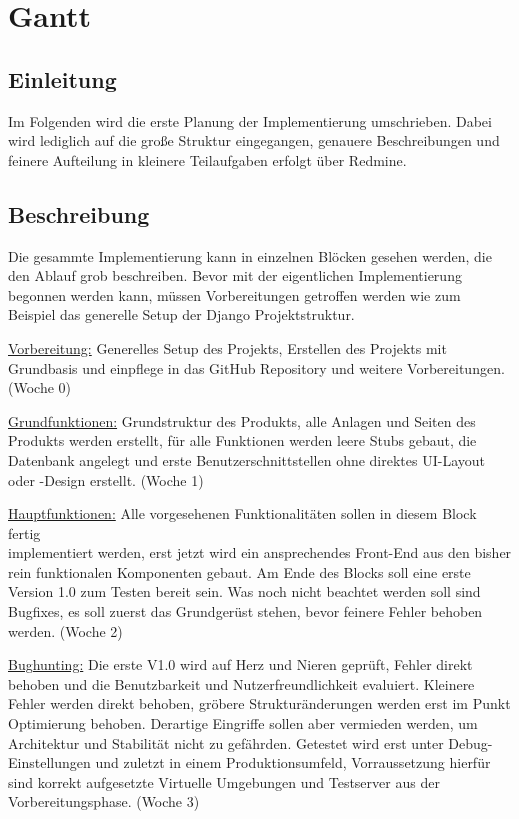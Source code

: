 \chapter{Gantt}

\section{Einleitung}
 Im Folgenden wird die erste Planung der Implementierung umschrieben. Dabei wird lediglich auf die große Struktur eingegangen, genauere Beschreibungen und feinere Aufteilung in kleinere Teilaufgaben erfolgt über Redmine.

\section{Beschreibung}
Die gesammte Implementierung kann in einzelnen Blöcken gesehen werden, die den Ablauf grob beschreiben. Bevor mit der eigentlichen Implementierung begonnen werden kann, müssen Vorbereitungen getroffen werden wie zum Beispiel das generelle Setup der Django Projektstruktur.

\underline{Vorbereitung:} Generelles Setup des Projekts, Erstellen des Projekts mit Grundbasis und einpflege in das GitHub Repository und weitere Vorbereitungen. (Woche 0)

\underline{Grundfunktionen:} Grundstruktur des Produkts, alle Anlagen und Seiten des Produkts werden erstellt, für alle Funktionen werden leere Stubs gebaut, die Datenbank angelegt und erste Benutzerschnittstellen ohne direktes UI-Layout oder -Design erstellt. (Woche 1)

\underline{Hauptfunktionen:} Alle vorgesehenen Funktionalitäten sollen in diesem Block fertig\\ implementiert werden, erst jetzt wird ein ansprechendes Front-End aus den bisher rein funktionalen Komponenten gebaut. Am Ende des Blocks soll eine erste Version 1.0 zum Testen bereit sein. Was noch nicht beachtet werden soll sind Bugfixes, es soll zuerst das Grundgerüst stehen, bevor feinere Fehler behoben werden. (Woche 2)

\underline{Bughunting:} Die erste V1.0 wird auf Herz und Nieren geprüft, Fehler direkt behoben und die Benutzbarkeit und Nutzerfreundlichkeit evaluiert. Kleinere Fehler werden direkt behoben, gröbere Strukturänderungen werden erst im Punkt Optimierung behoben. Derartige Eingriffe sollen aber vermieden werden, um Architektur und Stabilität nicht zu gefährden. Getestet wird erst unter Debug-Einstellungen und zuletzt in einem Produktionsumfeld, Vorraussetzung hierfür sind korrekt aufgesetzte Virtuelle Umgebungen und Testserver aus der Vorbereitungsphase. (Woche 3)

